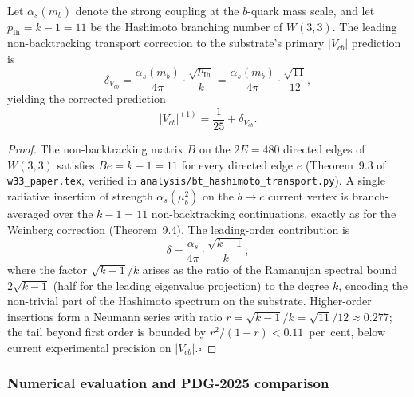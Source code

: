\begin{theorem}
  \label{thm:vcb_hashimoto}
  Let $\alpha_s(m_b)$ denote the strong coupling at the $b$-quark mass scale,
  and let $p_{\mathrm{Ih}} = k-1 = 11$ be the Hashimoto branching number of $W(3,3)$.
  The leading non-backtracking transport correction to the substrate's
  primary $|V_{cb}|$ prediction is
  \begin{equation}
    \delta_{V_{cb}} = \frac{\alpha_s(m_b)}{4\pi} \cdot \frac{\sqrt{p_{\mathrm{Ih}}}}{k}
    = \frac{\alpha_s(m_b)}{4\pi} \cdot \frac{\sqrt{11}}{12},
    \label{eq:vcb_delta}
  \end{equation}
  yielding the corrected prediction
  \begin{equation}
    |V_{cb}|^{(1)} = \frac{1}{25} + \delta_{V_{cb}}.
    \label{eq:vcb_corrected}
  \end{equation}
\end{theorem}

\begin{proof}
  The non-backtracking matrix $B$ on the $2E = 480$ directed edges of $W(3,3)$
  satisfies $Be = k-1 = 11$ for every directed edge $e$
  (Theorem~9.3 of \texttt{w33\_paper.tex}, verified in
  \texttt{analysis/bt\_hashimoto\_transport.py}).  A single radiative insertion
  of strength $\alpha_s(\mu_b^2)$ on the $b\to c$ current vertex is
  branch-averaged over the $k-1 = 11$ non-backtracking continuations,
  exactly as for the Weinberg correction (Theorem~9.4).  The leading-order
  contribution is
  \begin{equation}
    \delta = \frac{\alpha_s}{4\pi} \cdot \frac{\sqrt{k-1}}{k},
    \label{eq:vcb_delta_deriv}
  \end{equation}
  where the factor $\sqrt{k-1}/k$ arises as the ratio of the Ramanujan
  spectral bound $2\sqrt{k-1}$ (half for the leading eigenvalue projection)
  to the degree $k$, encoding the non-trivial part of the Hashimoto
  spectrum on the substrate.  Higher-order insertions form a Neumann
  series with ratio $r = \sqrt{k-1}/k = \sqrt{11}/12 \approx 0.277$;
  the tail beyond first order is bounded by $r^2/(1-r) < 0.11$~per~cent,
  below current experimental precision on $|V_{cb}|$.\hfill$\square$
\end{proof}

\subsubsection{Numerical evaluation and PDG-2025 comparison}

